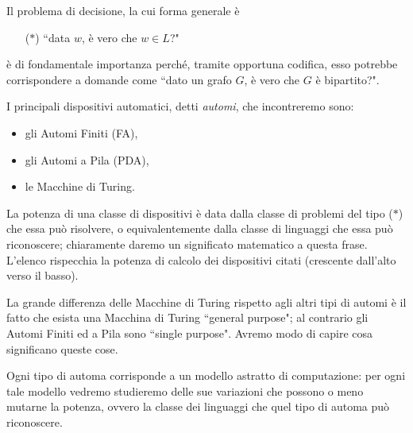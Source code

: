 \documentclass[runningheads,a4paper]{llncs}
\begin{document}
Il problema di decisione, la cui forma generale \`{e}
\begin{itemize}
\item[($\ast$)] ``data $w$, \`{e} vero che $w \in L$?"
\end{itemize}
\`{e} di fondamentale importanza perch\'{e}, tramite opportuna codifica, esso potrebbe corrispondere a domande come ``dato un grafo $G$, \`{e} vero che $G$ \`{e} bipartito?".

I principali dispositivi automatici, detti \emph{automi}, che incontreremo sono:
\begin{itemize}
  \item gli Automi Finiti (FA),
  \item gli Automi a Pila (PDA),
  \item le Macchine di Turing.
\end{itemize}
La potenza di una classe di dispositivi \`{e} data dalla classe di problemi del tipo ($\ast$) che essa pu\`{o} risolvere, o equivalentemente dalla classe di linguaggi che essa pu\`{o} riconoscere; chiaramente daremo un significato matematico a questa frase. L'elenco rispecchia la potenza di calcolo dei dispositivi citati (crescente dall'alto verso il basso).

La grande differenza delle Macchine di Turing rispetto agli altri tipi di automi \`{e} il fatto che esista una Macchina di Turing ``general purpose"; al contrario gli Automi Finiti ed a Pila sono ``single purpose". Avremo modo di capire cosa significano queste cose.

Ogni tipo di automa corrisponde a un modello astratto di computazione: per ogni tale modello vedremo studieremo delle sue variazioni che possono o meno mutarne la potenza, ovvero la classe dei linguaggi che quel tipo di automa pu\`{o} riconoscere. 
\end{document}
